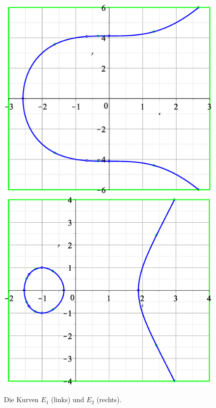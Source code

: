 \begin{figure}[h!]
	\centering
	\includegraphics[scale=.3]{img/curve_0_1.eps} \hspace{2cm}
	\includegraphics[scale=.3]{img/curve_0_2.eps}
	\caption{Die Kurven $E_1$ (links) und $E_2$ (rechts).}
\end{figure}
